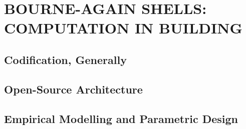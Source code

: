 \section{BOURNE-AGAIN SHELLS: COMPUTATION IN BUILDING}

\subsection{Codification, Generally}

\subsection{Open-Source Architecture}

\subsection{Empirical Modelling and Parametric Design}
